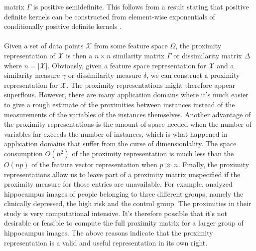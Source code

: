 matrix $\Gamma$ is positive semidefinite. This follows from a result
stating that positive definite kernels can be constructed from
element-wise exponentials of conditionally positive definite kernels
\citep{schoenberg38:_metric_spaces_compl_monot_funct,kondor02:_diffus}. \\
\\
%
%
\noindent
Given a set of data points $\mathcal{X}$ from some feature space
$\Omega$, the proximity representation of $\mathcal{X}$ is then a $n
\times n$ similarity matrix $\Gamma$ or dissimilarity matrix $\Delta$
where $n = | \mathcal{X}|$. Obviously, given a feature space
representation for $\mathcal{X}$ and a similarity measure $\gamma$ or
dissimilarity measure $\delta$, we can construct a proximity
representation for $\mathcal{X}$. The proximity representations might
therefore appear superflous. However, there are many application
domains where it's much easier to give a rough estimate of the
proximities between instances instead of the measurements of the
variables of the instances themselves. Another advantage of the
proximity representations is the amount of space needed when the
number of variables far exceeds the number of instances, which is what
happened in application domains that suffer from the curse of
dimensionlality. The space consumption $O(n^2)$ of the proximity
representation is much less than the $O(np)$ of the feature vector
representation when $p \gg n$. Finally, the proximity representations
allow us to leave part of a proximity matrix unspecified if the
proximity measure for those entries are unavailable. For example,
\citet{park07:_hippoc} analyzed hippocampus images of people belonging
to three different groups, namely the clinically depressed, the high
risk and the control group. The proximities in their study is very
computational intensive. It's therefore possible that it's not
desirable or feasible to compute the full proximity matrix for a
larger group of hippocampus images. The above
reasons indicate that the proximity representation is a valid and
useful representation in its own right.
